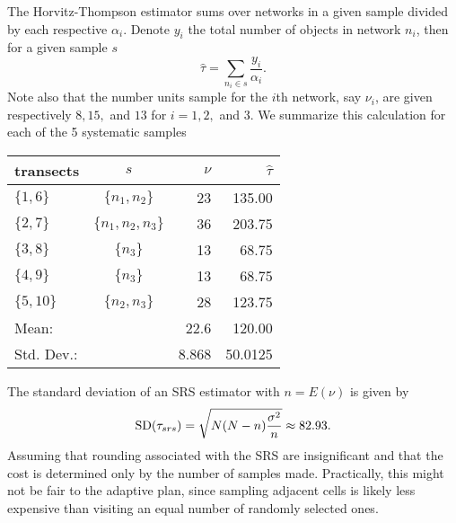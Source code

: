 \documentclass[usenames,dvipsnames]{homework}
\begin{document}
\begin{solution}

  The Horvitz-Thompson estimator sums over networks in a given sample divided by each respective $\alpha_i$.  Denote $y_i$ the total number of objects in network $n_i$, then for a given sample $s$
  $$
    \hat\tau = \sum_{n_i\in s} \frac{y_i}{\alpha_i}.
  $$
  Note also that the number units sample for the $i$th network, say $\nu_i$, are given respectively $8,15,$ and $13$ for $i=1,2,$ and $3$.
  We summarize this calculation for each of the 5 systematic samples
\begin{center}
\renewcommand{\arraystretch}{1.3}
\begin{tabular}{l c r r }
\hline
transects & $s$                & $\nu$ & $\hat\tau$\\\hline
$\{1,6 \}$& $\{n_1,n_2     \}$ &   23  &  135.00\\
$\{2,7 \}$& $\{n_1,n_2,n_3 \}$ &   36  &  203.75\\
$\{3,8 \}$& $\{n_3         \}$ &   13  &   68.75\\
$\{4,9 \}$& $\{n_3         \}$ &   13  &   68.75\\
$\{5,10\}$& $\{n_2,n_3     \}$ &   28  &  123.75\\
Mean:     &                    & 22.6  &  120.00\\
Std. Dev.:&                    & 8.868 & 50.0125\\
\hline
\end{tabular}
\end{center}

\end{solution}


\begin{solution}
  The standard deviation of an SRS estimator with $n = E(\nu)$ is given by
  $$
    \mathrm{SD}(\tau_{srs}) = \sqrt{ N(N-n) \frac{\sigma^2}{n} } \approx 82.93.
  $$
  Assuming that rounding associated with the SRS are insignificant and that the cost is determined only by the number of samples made.  Practically, this might not be fair to the adaptive plan, since sampling adjacent cells is likely less expensive than visiting an equal number of randomly selected ones.
\end{solution}
\end{document}
